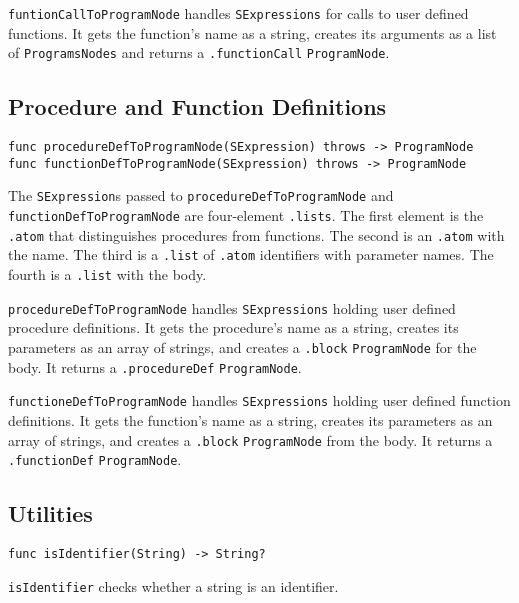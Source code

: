 \texttt{funtionCallToProgramNode} handles \texttt{SExpressions} for
calls to user defined functions. It gets the function's name as a string,
creates its arguments as a list of \texttt{ProgramsNodes} and returns
a \texttt{.functionCall} \texttt{ProgramNode}.
    
\subsection{Procedure and Function Definitions}
\begin{verbatim}
func procedureDefToProgramNode(SExpression) throws -> ProgramNode
func functionDefToProgramNode(SExpression) throws -> ProgramNode 
\end{verbatim}

The \texttt{SExpression}s passed to \texttt{procedureDefToProgramNode} and
\texttt{functionDefToProgramNode} are four-element \texttt{.lists}.
The first element is the \texttt{.atom} that distinguishes procedures from functions. The
second is an \texttt{.atom} with the name.
The third is a \texttt{.list} of \texttt{.atom}
identifiers with parameter names. The fourth is a \texttt{.list} with the
body.

 \texttt{procedureDefToProgramNode} handles \texttt{SExpressions}
 holding user defined procedure definitions.
 It gets the procedure's name as a string, creates its parameters as an array
 of strings, and creates a \texttt{.block} \texttt{ProgramNode} for the body.
 It returns a \texttt{.procedureDef} \texttt{ProgramNode}.\
 

\texttt{functioneDefToProgramNode} handles \texttt{SExpressions}
holding user defined function definitions.
It gets the function's name as a string, creates its parameters as an array
of strings, and creates a \texttt{.block} \texttt{ProgramNode} from the body.
It returns a \texttt{.functionDef} \texttt{ProgramNode}.

\subsection{Utilities}
\begin{verbatim}
func isIdentifier(String) -> String?
\end{verbatim}

\texttt{isIdentifier} checks whether a string is an identifier.
